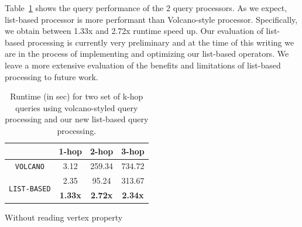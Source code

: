 Table~\ref{tbl:list-volcano} shows the query performance of the 2 query processors. As we expect, list-based processor is more performant than Volcano-style processor. Specifically, we obtain between 1.33x and 2.72x runtime speed up. Our evaluation of list-based processing is currently very preliminary and at the time of this writing we are in the process of implementing and optimizing our list-based operators. We leave a more extensive evaluation of the benefits and limitations of list-based processing to future work.

\begin{table}
	\centering
		\centering
		\bgroup
		\setlength{\tabcolsep}{8pt}
		\def\arraystretch{1.2}%
		\begin{tabular}{ |c|c|c|c| }
			\hline
			& \textbf{1-hop} & \textbf{2-hop} & \textbf{3-hop} \\ 
			\hline \hline
			\texttt{VOLCANO}& 3.12 & 259.34 & 734.72 \\ 
			\hline
			\multirow{2}{*}{\texttt{LIST-BASED}}& 2.35 & 95.24 & 313.67 \\ 
			& \textbf{1.33x} & \textbf{2.72x} & \textbf{2.34x} \\ 
			\hline
		\end{tabular}
		\egroup
		\captionsetup{justification=centering}
		\caption{Without reading vertex property}
	\label{tbl:list-volcano}
	\captionsetup{justification=centering}
	\caption{Runtime (in sec) for two set of k-hop queries using volcano-styled query processing and our new list-based query processing.  }
\end{table}


















